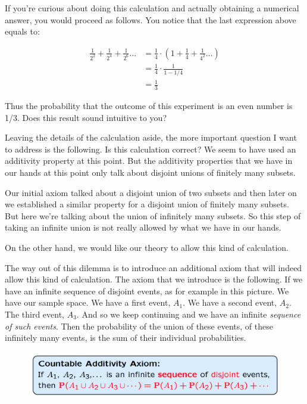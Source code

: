 \documentclass{tufte-handout}
\begin{document}
If you're curious about doing this calculation and actually obtaining a numerical answer, you would
proceed as follows. You notice that the last expression above equals to:

\begin{align*}
\frac{1}{2^2} + \frac{1}{2^4} + \frac{1}{2^6}  \ldots &=  \frac{1}{4} \cdot (1 + \frac{1}{4} + \frac{1}{4^2}  \ldots )\\
  &=  \frac{1}{4} \cdot  \frac{1}{ 1 -  1/4} \\
 &= \frac{1}{3} 
\end{align*}

Thus the probability that the outcome of this experiment is an even number is 1/3. Does this result sound intuitive to you?

Leaving the details of the calculation aside, the more important question I want to address is the
following. Is this calculation correct? We seem to have used an additivity property at this point. But the
additivity properties that we have in our hands at this point only talk about disjoint unions of finitely
many subsets.

Our initial axiom talked about a disjoint union of two subsets and then later on we established a similar
property for a disjoint union of finitely many subsets. But here we're talking about the union of infinitely
many subsets. So this step of taking an infinite union is not really allowed by what we have in our hands. 

On the other hand,
we would like our theory to allow this kind of calculation.

The way out of this dilemma is to introduce an additional axiom that will indeed allow this kind of
calculation. The axiom that we introduce is the following. If we have an infinite sequence of disjoint
events, as for example in this picture. We have our sample space. We have a first event, $A_1$. We have a
second event, $A_2$. The third event, $A_3$. And so we keep continuing and we have an infinite \textit{sequence of
such events}. Then the probability of the union of these events, of these infinitely many events, is the
sum of their individual probabilities.

\begin{figure}
  \includegraphics{CountableAdditivityAxiom}
\end{figure}
\end{document}
